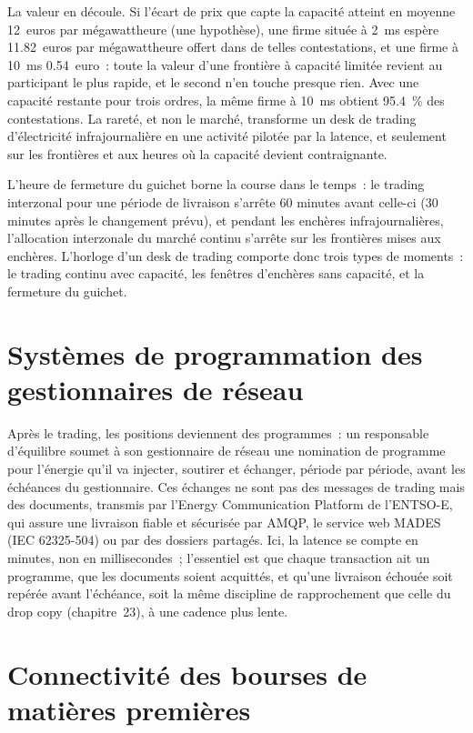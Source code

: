 La valeur en découle. Si l'écart de prix que capte la capacité atteint en moyenne 12~euros par mégawattheure (une hypothèse), une firme située à
\qty{2}{\milli\second} espère 11.82~euros par mégawattheure offert dans de telles contestations, et une firme à \qty{10}{\milli\second} 0.54~euro~:
toute la valeur d'une frontière à capacité limitée revient au participant le plus rapide, et le second n'en touche presque rien. Avec une capacité restante pour trois
ordres, la même firme à \qty{10}{\milli\second} obtient 95.4~\% des contestations. La rareté, et non le marché, transforme un desk de trading d'électricité infrajournalière
en une activité pilotée par la latence, et seulement sur les frontières et aux heures où la capacité devient contraignante.

L'heure de fermeture du guichet borne la course dans le temps~: le trading interzonal pour une période de livraison s'arrête 60 minutes avant celle-ci (30 minutes après le
changement prévu), et pendant les enchères infrajournalières, l'allocation interzonale du marché continu s'arrête sur les frontières mises aux enchères. L'horloge
d'un desk de trading comporte donc trois types de moments~: le trading continu avec capacité, les fenêtres d'enchères sans capacité, et la fermeture du guichet.

\section{Systèmes de programmation des gestionnaires de réseau}

Après le trading, les positions deviennent des programmes~: un responsable d'équilibre soumet à son gestionnaire de réseau une nomination de programme pour l'énergie qu'il va
injecter, soutirer et échanger, période par période, avant les échéances du gestionnaire. Ces échanges ne sont pas des messages de trading mais
des documents, transmis par l'Energy Communication Platform de l'ENTSO-E, qui assure une livraison fiable et sécurisée par AMQP, le service web MADES
(IEC 62325-504) ou par des dossiers partagés. Ici, la latence se compte en minutes, non en millisecondes~; l'essentiel est que chaque transaction ait un programme, que
les documents soient acquittés, et qu'une livraison échouée soit repérée avant l'échéance, soit la même discipline de rapprochement que celle du
drop copy (chapitre~23), à une cadence plus lente.

\section{Connectivité des bourses de matières premières}

